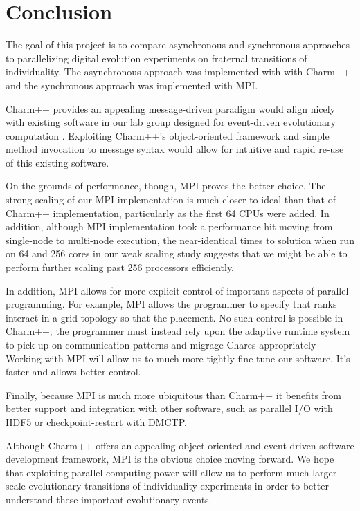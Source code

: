\section{Conclusion}

The goal of this project is to compare asynchronous and synchronous approaches to parallelizing digital evolution experiments on fraternal transitions of individuality.
The asynchronous approach was implemented with with Charm++ and the synchronous approach was implemented with MPI.

Charm++ provides an appealing message-driven paradigm would align nicely with existing software in our lab group designed for event-driven evolutionary computation \cite{lalejini2018evolving}.
Exploiting Charm++'s object-oriented framework and simple method invocation to message syntax would allow for intuitive and rapid re-use of this existing software.

On the grounds of performance, though, MPI proves the better choice.
The strong scaling of our MPI implementation is much closer to ideal than that of Charm++ implementation, particularly as the first 64 CPUs were added.
In addition, although MPI implementation took a performance hit moving from single-node to multi-node execution, the near-identical times to solution when run on 64 and 256 cores in our weak scaling study suggests that we might be able to perform further scaling past 256 processors efficiently.

In addition, MPI allows for more explicit control of important aspects of parallel programming.
For example, MPI allows the programmer to specify that ranks interact in a grid topology so that the placement.
No such control is possible in Charm++; the programmer must instead rely upon the adaptive runtime system to pick up on communication patterns and migrage Chares appropriately
Working with MPI will allow us to much more tightly fine-tune our software.
It's faster and allows better control.

Finally, because MPI is much more ubiquitous than Charm++ it benefits from better support and integration with other software, such as parallel I/O with HDF5 or checkpoint-restart with DMCTP.

Although Charm++ offers an appealing object-oriented and event-driven software development framework, MPI is the obvious choice moving forward.
We hope that exploiting parallel computing power will allow us to perform much larger-scale evolutionary transitions of individuality experiments in order to better understand these important evolutionary events.
